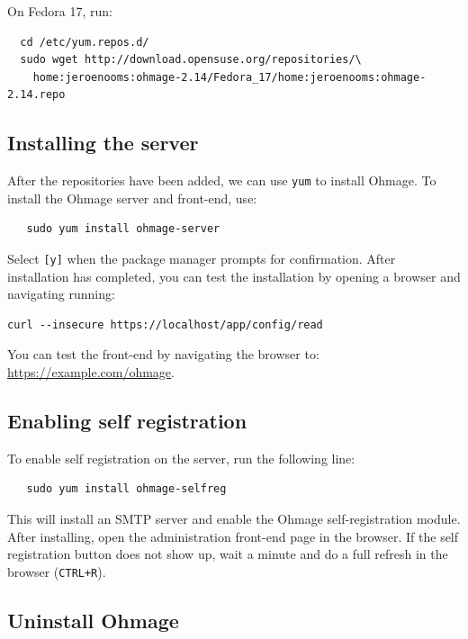 \documentclass{scrartcl}
\begin{document}
\noindent On Fedora 17, run:

\begin{verbatim}
  cd /etc/yum.repos.d/
  sudo wget http://download.opensuse.org/repositories/\
    home:jeroenooms:ohmage-2.14/Fedora_17/home:jeroenooms:ohmage-2.14.repo
\end{verbatim}

\subsection{Installing the server}

After the repositories have been added, we can use \texttt{yum} to install
Ohmage. To install the Ohmage server and front-end, use:

\begin{verbatim}
   sudo yum install ohmage-server
\end{verbatim}

\noindent Select \texttt{[y]} when the package manager prompts for confirmation.
After installation has completed, you can test the installation by
opening a browser and navigating running:

\begin{verbatim}
curl --insecure https://localhost/app/config/read
\end{verbatim}

\noindent You can test the front-end by navigating the browser to: \\

\url{https://example.com/ohmage}.

\subsection{Enabling self registration}

To enable self registration on the server, run the following line:
\begin{verbatim}
   sudo yum install ohmage-selfreg
\end{verbatim}
This will install an SMTP server and enable the Ohmage self-registration module.
After installing, open the administration front-end page in the browser. If the
self registration button does not show up, wait a minute and do a full refresh
in the browser (\texttt{CTRL+R}).

\subsection{Uninstall Ohmage}
\end{document}
